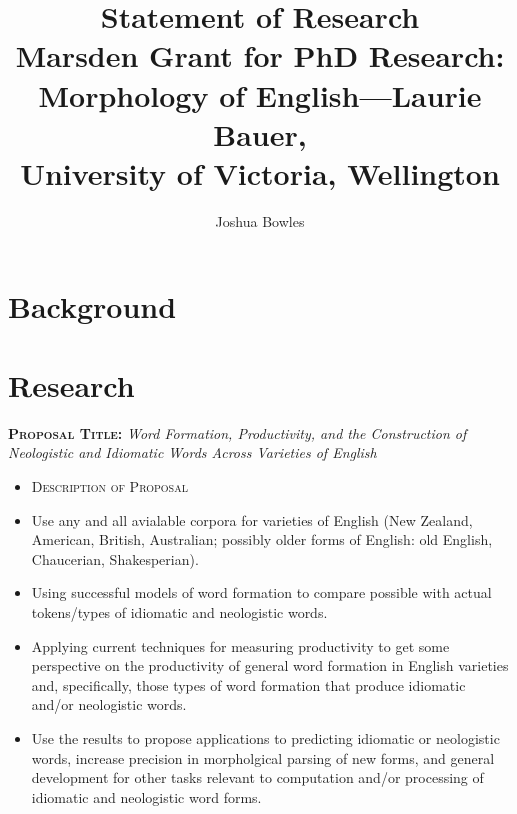 \documentclass{article}
\begin{document}
\title{Statement of Research \\ 
\small Marsden Grant for PhD Research:\\
Morphology of English---Laurie Bauer,\\
 University of Victoria, Wellington}

\author{Joshua Bowles}

\maketitle


\section{Background}



\section{Research}
\textsc{{\bf Proposal Title:}} {\sl Word Formation, Productivity, and the Construction of Neologistic and Idiomatic Words Across Varieties of English}

\begin{itemize}
\item[] \begin{center}\textsc{Description of Proposal}\end{center}
\item  Use any and all avialable corpora for varieties of English (New Zealand, American, British, Australian; possibly older forms of English: old English, Chaucerian, Shakesperian).
\item  Using successful models of word formation to compare possible with actual tokens/types of idiomatic and neologistic words.
\item  Applying current techniques for measuring productivity to get some perspective on the productivity of general word formation in English varieties and, specifically, those types of word formation that produce idiomatic and/or neologistic words.
\item  Use the results to propose applications to predicting idiomatic or neologistic words, increase precision in morpholgical parsing of new forms, and general development for other tasks relevant to computation and/or processing of idiomatic and neologistic word forms.
\end{itemize}
\end{document}
